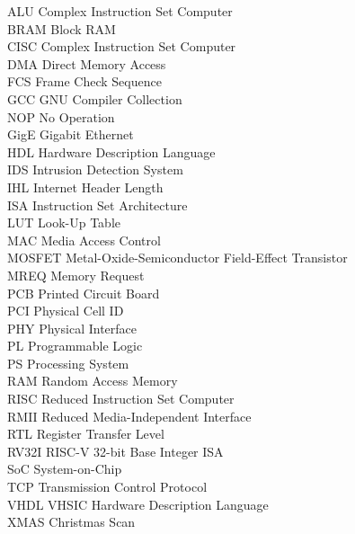 \begin{Abbreviations}


ALU    \hfill Complex Instruction Set Computer     \\ 
BRAM    \hfill Block RAM   \\                   
CISC    \hfill Complex Instruction Set Computer   \\                   
DMA  \hfill  Direct Memory Access    \\
FCS    \hfill Frame Check Sequence \\
GCC    \hfill GNU Compiler Collection      \\
NOP    \hfill No Operation     \\
GigE    \hfill Gigabit Ethernet     \\
HDL    \hfill Hardware Description Language     \\
IDS    \hfill Intrusion Detection System     \\
IHL    \hfill Internet Header Length     \\
ISA    \hfill Instruction Set Architecture     \\
LUT    \hfill Look-Up Table     \\
MAC    \hfill Media Access Control     \\
MOSFET    \hfill Metal-Oxide-Semiconductor Field-Effect Transistor     \\
MREQ    \hfill Memory Request     \\
PCB    \hfill Printed Circuit Board    \\
PCI    \hfill Physical Cell ID     \\
PHY    \hfill Physical Interface     \\
PL    \hfill Programmable Logic     \\
PS    \hfill Processing System     \\
RAM    \hfill Random Access Memory     \\
RISC    \hfill Reduced Instruction Set Computer     \\
RMII    \hfill Reduced Media-Independent Interface     \\
RTL    \hfill Register Transfer Level     \\
RV32I    \hfill RISC-V 32-bit Base Integer ISA     \\
SoC    \hfill System-on-Chip     \\
TCP    \hfill Transmission Control Protocol     \\
VHDL    \hfill VHSIC Hardware Description Language     \\
XMAS    \hfill Christmas Scan     \\
\end{Abbreviations} 